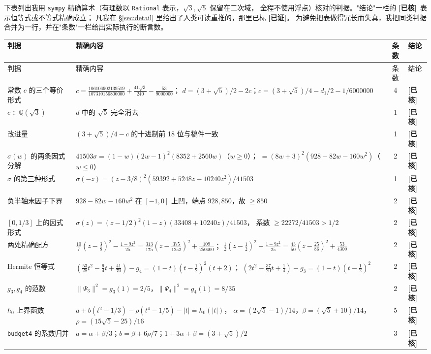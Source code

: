 \documentclass[UTF8,11pt]{ctexart}
\theoremstyle{definition}
\newcommand{\ok}{\textcolor[rgb]{0.05,0.45,0.15}{\bfseries [已证]}}
\newcommand{\chk}{\textcolor[rgb]{0.05,0.25,0.55}{\bfseries [已核]}}
\begin{document}
下表列出我用 \texttt{sympy} 精确算术（有理数以 \texttt{Rational} 表示，$\sqrt3,\sqrt5$ 保留在二次域，
全程不使用浮点）核对的判据。"结论"一栏的 \chk\ 表示恒等式或不等式精确成立；
凡我在 \S\ref{sec:detail} 里给出了人类可读重推的，那里已标 \ok。
为避免把表做得冗长而失真，我把同类判据合并为一行，并在"条数"一栏给出实际执行的断言数。

\begingroup\small
\begin{longtable}{@{}p{}p{}cp{}@{}}
\toprule
判据 & 精确内容 & 条数 & 结论\\
\midrule
\endfirsthead
\toprule
判据 & 精确内容 & 条数 & 结论\\
\midrule
\endhead
常数 $c$ 的三个等价形式 &
 $c=\frac{106106902139519}{107310156800000}+\frac{41\sqrt3}{240}-\frac{53}{9000000}$；
 $d=(3+\sqrt5)/2-2c$；$c=(3+\sqrt5)/4-d_1/2-1/6000000$ & 4 & \chk\\
$c\in\mathbb Q(\sqrt3)$ & $d$ 中的 $\sqrt5$ 完全消去 & 1 & \chk\\
改进量 & $(3+\sqrt5)/4-c$ 的十进制前 18 位与稿件一致 & 1 & \chk\\
$\sigma(w)$ 的两条因式分解 &
 $41503\sigma=(1-w)(2w-1)^2(8352+2560w)$（$w\ge0$）；
 $=(8w+3)^2(928-82w-160w^2)$（$w\le0$） & 2 & \chk\\
$\sigma$ 的第三种形式 & $\sigma(-z)=(z-3/8)^2(59392+5248z-10240z^2)/41503$ & 1 & \chk\\
负半轴末因子下界 & $928-82w-160w^2$ 在 $[-1,0]$ 上凹，端点 $928,850$，故 $\ge850$ & 2 & \chk\\
$[0,1/3]$ 上的因式形式 & $\sigma(z)=(z-1/2)^2(1-z)(33408+10240z)/41503$，
 系数 $\ge22272/41503>1/2$ & 2 & \chk\\
两处精确配方 &
 $\frac{10}7(z-\frac38)^2-\frac{1-9z^2}{25}=\frac{313}{175}(z-\frac{375}{1252})^2+\frac{109}{250400}$；
 $\frac12(z-\frac12)^2-\frac{1-9z^2}{25}=\frac{43}{50}(z-\frac{25}{86})^2+\frac{53}{4300}$ & 2 & \chk\\
Hermite 恒等式 &
 $(\frac{53}{28}t^2-\frac94t+\frac{41}{70})-g_4=(1-t)(t-\frac12)^2(t+2)$；
 $(2t^2-\frac{37}{20}t+\frac14)-g_3=(1-t)(t-\frac12)^2$ & 2 & \chk\\
$g_3,g_4$ 的范数 & $\|\Psi_3\|^2=g_3(1)=2/5$，$\|\Psi_4\|^2=g_4(1)=8/35$ & 2 & \chk\\
$h_0$ 上界函数 & $a+b(t^2-1/3)-\rho(t^4-1/5)-|t|=h_0(|t|)$，
 $\alpha=(2\sqrt5-1)/14$，$\beta=(\sqrt5+10)/14$，$\rho=(15\sqrt5-25)/16$ & 5 & \chk\\
\texttt{budget4} 的系数归并 & $a=\alpha+\beta/3$；$b=\beta+6\rho/7$；$1+3\alpha+\beta=(3+\sqrt5)/2$ & 3 & \chk\\

\end{longtable}
\end{document}
